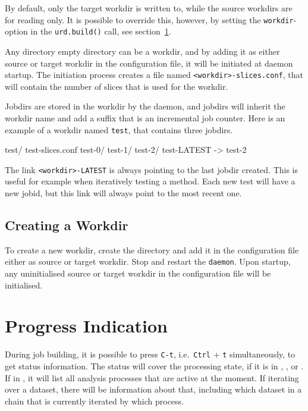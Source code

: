 By default, only the target workdir is written to, while the source
workdirs are for reading only.  It is possible to override this,
however, by setting the \texttt{workdir}-option in
the \texttt{urd.build()} call, see section~\ref{}.

Any directory empty directory can be a workdir, and by adding it as
either source or target workdir in the configuration file, it will be
initiated at daemon startup.  The initiation process creates a file
named \texttt{<workdir>-slices.conf}, that will contain the number of
slices that is used for the workdir.

Jobdirs are stored in the workdir by the daemon, and jobdirs will
inherit the workdir name and add a suffix that is an incremental job
counter.  Here is an example of a workdir named \texttt{test}, that
contains three jobdirs.
\begin{shell}
test/
    test-slices.conf
    test-0/
    test-1/
    test-2/
    test-LATEST -> test-2
\end{shell}
The link \texttt{<workdir>-LATEST} is always pointing to the last
jobdir created.  This is useful for example when iteratively testing a
method.  Each new test will have a new jobid, but this link will
always point to the most recent one.


\subsection{Creating a Workdir}
To create a new workdir, create the directory and add it in the
configuration file either as source or target workdir.  Stop and
restart the \texttt{daemon}.  Upon startup, any uninitialised source
or target workdir in the configuration file will be initialised.




\clearpage

\section{Progress Indication}

During job building, it is possible to press \texttt{C-t},
i.e.\ \texttt{Ctrl} + \texttt{t} simultaneously, to get status
information.  The status will cover the processing state, if it is
in \prepare, \analysis, or \synthesis.  If in \analysis, it will list
all analysis processes that are active at the moment.  If iterating
over a dataset, there will be information about that, including which
dataset in a chain that is currently iterated by which \analysis
process.

